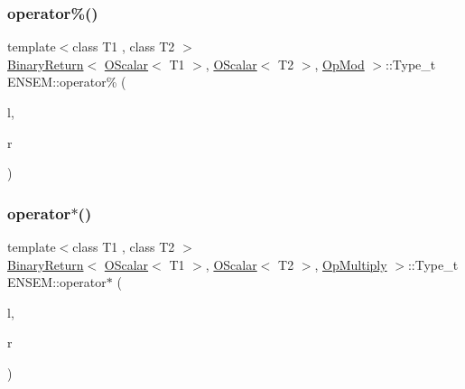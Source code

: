 \subsubsection{\texorpdfstring{operator\%()}{operator\%()}}
{\footnotesize\ttfamily template$<$class T1 , class T2 $>$ \\
\mbox{\hyperlink{structENSEM_1_1BinaryReturn}{Binary\+Return}}$<$ \mbox{\hyperlink{classENSEM_1_1OScalar}{O\+Scalar}}$<$ T1 $>$, \mbox{\hyperlink{classENSEM_1_1OScalar}{O\+Scalar}}$<$ T2 $>$, \mbox{\hyperlink{structENSEM_1_1OpMod}{Op\+Mod}} $>$\+::Type\+\_\+t E\+N\+S\+E\+M\+::operator\% (\begin{DoxyParamCaption}\item[{const \mbox{\hyperlink{classENSEM_1_1OScalar}{O\+Scalar}}$<$ T1 $>$ \&}]{l,  }\item[{const \mbox{\hyperlink{classENSEM_1_1OScalar}{O\+Scalar}}$<$ T2 $>$ \&}]{r }\end{DoxyParamCaption})\hspace{0.3cm}{\ttfamily [inline]}}

\mbox{\label{group__obsscalar_gaa61093018ee3eb29e249efd26f29bbdd}} 
\subsubsection{\texorpdfstring{operator$\ast$()}{operator*()}\hspace{0.1cm}{\footnotesize\ttfamily [1/5]}}
{\footnotesize\ttfamily template$<$class T1 , class T2 $>$ \\
\mbox{\hyperlink{structENSEM_1_1BinaryReturn}{Binary\+Return}}$<$ \mbox{\hyperlink{classENSEM_1_1OScalar}{O\+Scalar}}$<$ T1 $>$, \mbox{\hyperlink{classENSEM_1_1OScalar}{O\+Scalar}}$<$ T2 $>$, \mbox{\hyperlink{structENSEM_1_1OpMultiply}{Op\+Multiply}} $>$\+::Type\+\_\+t E\+N\+S\+E\+M\+::operator$\ast$ (\begin{DoxyParamCaption}\item[{const \mbox{\hyperlink{classENSEM_1_1OScalar}{O\+Scalar}}$<$ T1 $>$ \&}]{l,  }\item[{const \mbox{\hyperlink{classENSEM_1_1OScalar}{O\+Scalar}}$<$ T2 $>$ \&}]{r }\end{DoxyParamCaption})\hspace{0.3cm}{\ttfamily [inline]}}

\mbox{\label{group__obsscalar_ga3db0be55f47b788fa0f005d8e7bcfbac}} 
